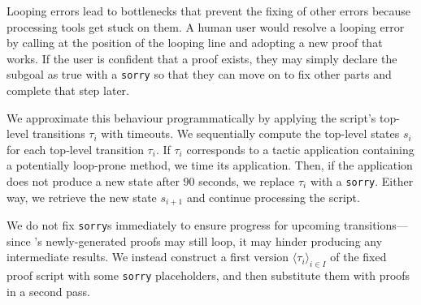 \documentclass[10pt,conference]{IEEEtran}
\begin{document}
Looping errors lead to bottlenecks that prevent the fixing of other errors because processing tools get stuck on them.
A human user would resolve a looping error by calling \sledgehammer{} at the position of the looping line and adopting a new proof that works. If the user is confident that a proof exists, they may simply declare the subgoal as true with a \texttt{sorry} so that they can move on to fix other parts and complete that step later.

We approximate this behaviour programmatically by applying the script's top-level transitions $\tau_i$ with timeouts. We sequentially compute the top-level states $s_i$ for each top-level transition $\tau_i$. If $\tau_i$ corresponds to a tactic application containing a potentially loop-prone method, we time its application. Then, if the application does not produce a new state after $90$ seconds, we replace $\tau_i$ with a \texttt{sorry}. Either way, we retrieve the new state $s_{i+1}$ and continue processing the script. 

We do not fix \texttt{sorry}s immediately to ensure progress for upcoming transitions---since \sledgehammer{}'s newly-generated proofs may still loop, it may hinder producing any intermediate results. We instead construct a first version $\langle \tau_i\rangle_{i\in I}$ of the fixed proof script with some \texttt{sorry} placeholders, and then substitute them with \sledgehammer{} proofs in a second pass.
\end{document}
